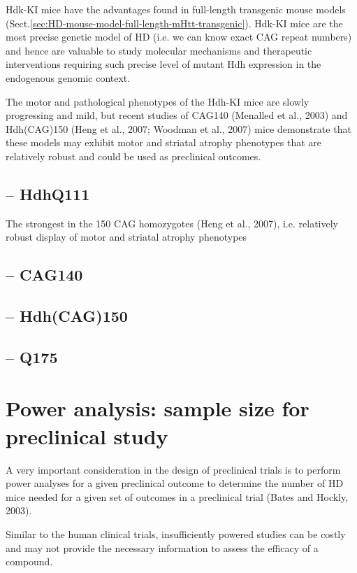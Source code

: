 Hdk-KI mice have the advantages found in full-length transgenic mouse models
(Sect.\ref{sec:HD-mouse-model-full-length-mHtt-transgenic}).
Hdk-KI mice are the most precise genetic model of HD (i.e. we can know exact CAG
repeat numbers) and hence are valuable to study molecular mechanisms and
therapeutic interventions requiring such precise level of mutant Hdh expression
in the endogenous genomic context.

The motor and pathological phenotypes of the Hdh-KI mice are slowly progressing
and mild, but recent studies of CAG140 (Menalled et al., 2003) and Hdh(CAG)150
(Heng et al., 2007; Woodman et al., 2007) mice demonstrate that these models may exhibit
motor and striatal atrophy phenotypes that are relatively robust and could be
used as preclinical outcomes.

\subsection{-- HdhQ111}

The strongest in the 150 CAG homozygotes (Heng et al., 2007), i.e. relatively
robust display of motor and striatal atrophy phenotypes


\subsection{-- CAG140}

\subsection{-- Hdh(CAG)150}

\subsection{-- Q175}
\label{sec:mouse-Q175}


\section{Power analysis: sample size for preclinical study}
\label{sec:power-analaysis}

A very important consideration in the design of preclinical trials is to perform
power analyses for a given preclinical outcome to determine the number of HD
mice needed for a given set of outcomes in a preclinical trial (Bates and
Hockly, 2003).

Similar to the human clinical trials, insufficiently powered studies can be costly and may not provide
the necessary information to assess the efficacy of a compound. 

